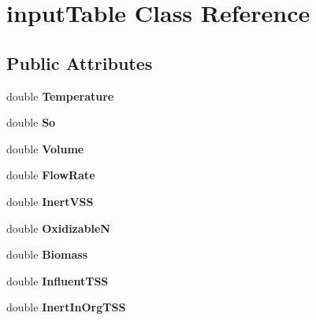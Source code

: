 \hypertarget{classinput_table}{}\section{input\+Table Class Reference}
\label{classinput_table}
\subsection*{Public Attributes}
\begin{DoxyCompactItemize}
\item 
\mbox{\label{classinput_table_a4c412303d0b2ff2e7baa40cb4c112122}} 
double {\bfseries Temperature}
\item 
\mbox{\label{classinput_table_a7bdcd7b27acd54f54183d2203ab2d887}} 
double {\bfseries So}
\item 
\mbox{\label{classinput_table_a3192ea9121c2861a9b6575f75ec861a1}} 
double {\bfseries Volume}
\item 
\mbox{\label{classinput_table_a5448810ec05dd5ba2b4ae5f288de3fb1}} 
double {\bfseries Flow\+Rate}
\item 
\mbox{\label{classinput_table_a7eb34d0e3f11aae5c98cd0be938d04cd}} 
double {\bfseries Inert\+V\+SS}
\item 
\mbox{\label{classinput_table_a717225e384c7cf739a8888397afdd77e}} 
double {\bfseries OxidizableN}
\item 
\mbox{\label{classinput_table_a7d57060b1b03d5f66e213f3fcc75fa65}} 
double {\bfseries Biomass}
\item 
\mbox{\label{classinput_table_a14654494c9a43958b27cd20a41848251}} 
double {\bfseries Influent\+T\+SS}
\item 
\mbox{\label{classinput_table_ac3879abac7aabdf985c67ab04f2d1aba}} 
double {\bfseries Inert\+In\+Org\+T\+SS}
\item 
\mbox{\label{classinput_table_ace8008f45e0db0f4a1fbccc40d2b4a9a}} 

\end{DoxyCompactItemize}
